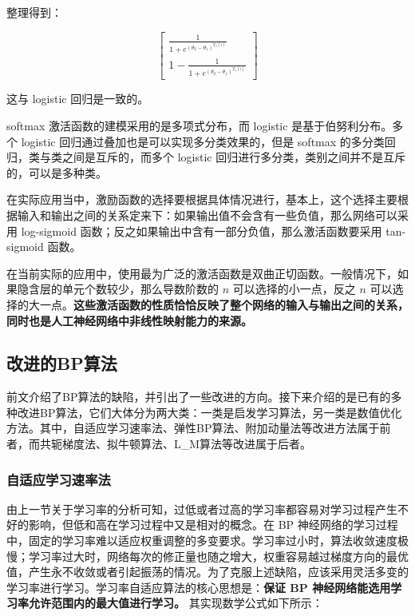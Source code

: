 \documentclass[UTF8]{ctexart}
\begin{document}
整理得到：

\begin{equation}
\begin{bmatrix}
\frac{1}{1+e^{(\theta_2 - \theta_1)^{T_x(i)}}} \\ 
1 - \frac{1}{1+e^{(\theta_2 - \theta_1)^{T_x(i)}}}
\end{bmatrix}
\end{equation}

这与 logistic 回归是一致的。 \par

softmax 激活函数的建模采用的是多项式分布，而 logistic 是基于伯努利分布。多个 logistic 回归通过叠加也是可以实现多分类效果的，但是 softmax 的多分类回归，类与类之间是互斥的，而多个 logistic 回归进行多分类，类别之间并不是互斥的，可以是多种类。 \par

在实际应用当中，激励函数的选择要根据具体情况进行，基本上，这个选择主要根据输入和输出之间的关系定来下：如果输出值不会含有一些负值，那么网络可以采用 log-sigmoid 函数；反之如果输出中含有一部分负值，那么激活函数要采用 tan-sigmoid 函数。 \par

在当前实际的应用中，使用最为广泛的激活函数是双曲正切函数。一般情况下，如果隐含层的单元个数较少，那么导数阶数的 $n$ 可以选择的小一点，反之 $n$ 可以选择的大一点。\textbf{这些激活函数的性质恰恰反映了整个网络的输入与输出之间的关系，同时也是人工神经网络中非线性映射能力的来源。}

\subsection{改进的BP算法}

前文介绍了BP算法的缺陷，并引出了一些改进的方向。接下来介绍的是已有的多种改进BP算法，它们大体分为两大类：一类是启发学习算法，另一类是数值优化方法。其中，自适应学习速率法、弹性BP算法、附加动量法等改进方法属于前者，而共轭梯度法、拟牛顿算法、L\_M算法等改进属于后者。 \par


\subsubsection{自适应学习速率法}

由上一节关于学习率的分析可知，过低或者过高的学习率都容易对学习过程产生不好的影响，但低和高在学习过程中又是相对的概念。在 BP 神经网络的学习过程中，固定的学习率难以适应权重调整的多变要求。学习率过小时，算法收敛速度极慢；学习率过大时，网络每次的修正量也随之增大，权重容易越过梯度方向的最优值，产生永不收敛或者引起振荡的情况。为了克服上述缺陷，应该采用灵活多变的学习率进行学习。学习率自适应算法的核心思想是：\textbf{保证 BP 神经网络能选用学习率允许范围内的最大值进行学习。} 其实现数学公式如下所示： \par
\end{document}
